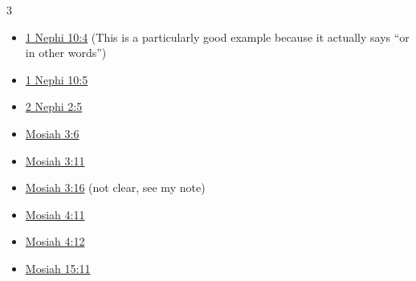 			\begin{multicols}{3}
				\begin{itemize}
					\item \hyperref[1NEPHI-10-4]{1 Nephi 10:4} (This is a particularly good example because it actually says ``or in other words'')
					\item \hyperref[1NEPHI-10-5]{1 Nephi 10:5}
					\item \hyperref[2NEPHI-2-5]{2 Nephi 2:5}
					\item \hyperref[MOSIAH-3-6]{Mosiah 3:6}
					\item \hyperref[MOSIAH-3-11]{Mosiah 3:11}
					\item \hyperref[MOSIAH-3-16]{Mosiah 3:16} (not clear, see my note)
					\item \hyperref[MOSIAH-4-11]{Mosiah 4:11}
					\item \hyperref[MOSIAH-4-12]{Mosiah 4:12}
					\item \hyperref[MOSIAH-15-11]{Mosiah 15:11}
				\end{itemize}
			\end{multicols}

	
